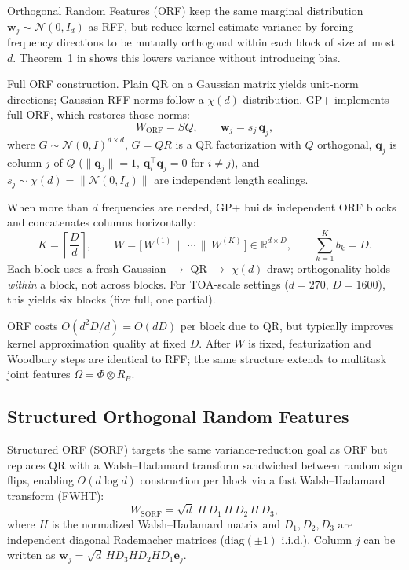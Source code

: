 \documentclass[11pt]{article}
\newcommand{\Ph}{\Phi}
\newcommand{\Om}{\Omega}
\newcommand{\RB}{R_B}
\begin{document}
Orthogonal Random Features (ORF) \citep{yu2016orf} keep the same marginal distribution
$\mathbf w_j \sim \mathcal{N}(0, I_d)$ as RFF, but reduce kernel-estimate variance by forcing
frequency directions to be mutually orthogonal within each block of size at most $d$.
Theorem~1 in \citet{yu2016orf} shows this lowers variance without introducing bias.

Full ORF construction.
Plain QR on a Gaussian matrix yields unit-norm directions; Gaussian RFF norms follow a $\chi(d)$
distribution.
GP+ implements full ORF, which restores those norms:
\begin{equation}
  \label{eq:progress-orf}
  W_{\mathrm{ORF}} = S Q,
  \qquad
  \mathbf w_j = s_j\,\mathbf q_j,
\end{equation}
where $G \sim \mathcal{N}(0,I)^{d \times d}$, $G = QR$ is a QR factorization with $Q$ orthogonal,
$\mathbf q_j$ is column $j$ of $Q$ ($\|\mathbf q_j\| = 1$, $\mathbf q_i^\top \mathbf q_j = 0$ for $i \ne j$),
and $s_j \sim \chi(d) = \|\mathcal{N}(0, I_d)\|$ are independent length scalings.

When more than $d$ frequencies are needed, GP+ builds independent ORF blocks and concatenates
columns horizontally:
\begin{equation}
  \label{eq:progress-block-loop}
  K = \left\lceil \frac{D}{d} \right\rceil,
  \qquad
  W = \bigl[\, W^{(1)} \,\|\, \cdots \,\|\, W^{(K)} \,\bigr] \in \mathbb{R}^{d \times D},
  \qquad
  \sum_{k=1}^{K} b_k = D.
\end{equation}
Each block uses a fresh Gaussian $\to$ QR $\to$ $\chi(d)$ draw; orthogonality holds \emph{within} a block,
not across blocks.
For TOA-scale settings ($d = 270$, $D = 1600$), this yields six blocks (five full, one partial).

ORF costs $O(d^2 D/d) = O(dD)$ per block due to QR, but typically improves kernel approximation quality
at fixed $D$.
After $W$ is fixed, featurization and Woodbury steps are identical to RFF; the same structure extends to
multitask joint features $\Om = \Ph \otimes \RB$.

\subsection{Structured Orthogonal Random Features}
\label{sec:progress-sorf}

Structured ORF (SORF) \citep{yu2016orf} targets the same variance-reduction goal as ORF but replaces
QR with a Walsh--Hadamard transform sandwiched between random sign flips, enabling
$O(d \log d)$ construction per block via a fast Walsh--Hadamard transform (FWHT):
\begin{equation}
  \label{eq:progress-sorf}
  W_{\mathrm{SORF}} = \sqrt{d}\; H\, D_1\, H\, D_2\, H\, D_3,
\end{equation}
where $H$ is the normalized Walsh--Hadamard matrix and $D_1, D_2, D_3$ are independent diagonal
Rademacher matrices ($\mathrm{diag}(\pm 1)$ i.i.d.).
Column $j$ can be written as $\mathbf w_j = \sqrt{d}\, H D_3 H D_2 H D_1 \mathbf e_j$.
\end{document}
